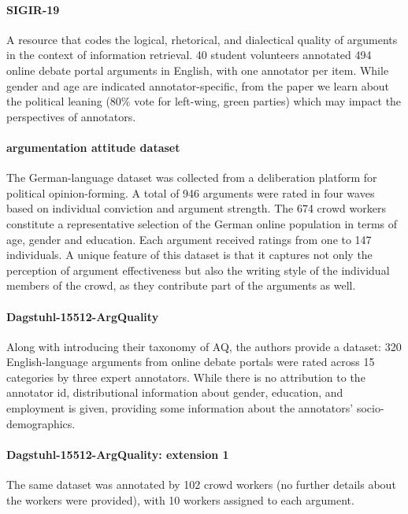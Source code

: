 \paragraph{SIGIR-19 \cite{potthast2019argument}}
A resource that codes the logical, rhetorical, and dialectical quality of arguments in the context of information retrieval. 40 student volunteers annotated 494 online debate portal arguments in English, with one annotator per item. While gender and age are indicated annotator-specific, from the paper we learn about the political leaning (80\% vote for left-wing, green parties) which may impact the perspectives of annotators.

\paragraph{argumentation attitude dataset \cite{brenneis-etal-2021-will}}
The German-language dataset was collected from a deliberation platform for political opinion-forming. A total of 946 arguments were rated in four waves based on individual conviction and argument strength. The 674 crowd workers constitute a representative selection of the German online population in terms of age, gender and education. Each argument received ratings from one to 147 individuals.
A unique feature of this dataset is that it captures not only the perception of argument effectiveness but also the writing style of the individual members of the crowd, as they contribute part of the arguments as well.

\paragraph{Dagstuhl-15512-ArgQuality \cite{wachsmuth-etal-2017-computational}}
Along with introducing their taxonomy of AQ, the authors provide a dataset: 320 English-language arguments from online debate portals were rated across 15 categories by three expert annotators.
While there is no attribution to the annotator id, distributional information about gender, education, and employment is given, providing some information about the annotators' socio-demographics.

\paragraph{Dagstuhl-15512-ArgQuality: extension 1 \cite{wachsmuth-etal-2017-argumentation}}
The same dataset was annotated by 102 crowd workers (no further details about the workers were provided), with 10 workers assigned to each argument.

